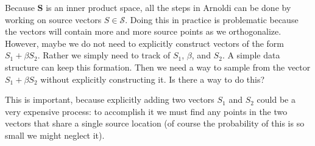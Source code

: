 \documentclass[12pt]{article}
\begin{document}
Because $\mathbf{S}$ is an inner product space, all the steps in Arnoldi can be done by working on source vectors $S \in \mathcal{S}$.   Doing this in practice is problematic because the vectors will contain more and more source points as we orthogonalize.  However, maybe we do not need to explicitly construct vectors of the form $S_1 + \beta S_2$.  Rather we simply need to track of $S_1$, $\beta$, and $S_2$.   A simple data structure can keep this formation.   Then we need a way to sample from the vector $S_1 + \beta S_2$ without explicitly constructing it.  Is there a way to do this?

This is important, because explicitly adding two vectors $S_1$ and $S_2$ could be a very expensive process: to accomplish it we must find any points in the two vectors that share a single source location (of course the probability of this is so small we might neglect it).
\end{document}
